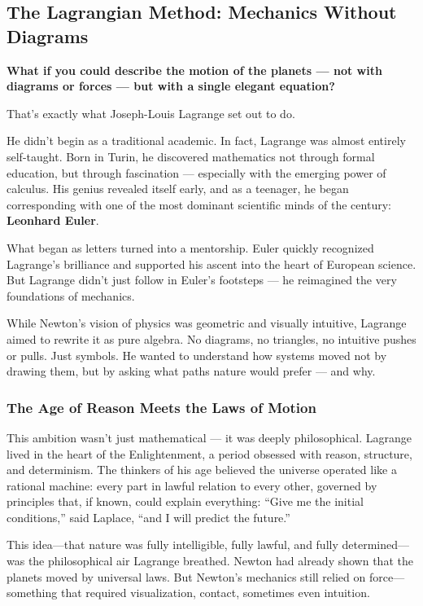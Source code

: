 \subsection{The Lagrangian Method: Mechanics Without Diagrams}

\textbf{What if you could describe the motion of the planets — not with diagrams or forces — but with a single elegant equation?}

That’s exactly what Joseph-Louis Lagrange set out to do.

He didn’t begin as a traditional academic. In fact, Lagrange was almost entirely self-taught. Born in Turin, he discovered mathematics not through formal education, but through fascination — especially with the emerging power of calculus. His genius revealed itself early, and as a teenager, he began corresponding with one of the most dominant scientific minds of the century: \textbf{Leonhard Euler}.

What began as letters turned into a mentorship. Euler quickly recognized Lagrange’s brilliance and supported his ascent into the heart of European science. But Lagrange didn’t just follow in Euler’s footsteps — he reimagined the very foundations of mechanics.

While Newton's vision of physics was geometric and visually intuitive, Lagrange aimed to rewrite it as pure algebra. No diagrams, no triangles, no intuitive pushes or pulls. Just symbols. He wanted to understand how systems moved not by drawing them, but by asking what paths nature would prefer — and why.


\subsubsection{The Age of Reason Meets the Laws of Motion}

This ambition wasn’t just mathematical — it was deeply philosophical. Lagrange lived in the heart of the Enlightenment, a period obsessed with reason, structure, and determinism. The thinkers of his age believed the universe operated like a rational machine: every part in lawful relation to every other, governed by principles that, if known, could explain everything:  ``Give me the initial conditions,'' said Laplace, ``and I will predict the future.''


This idea—that nature was fully intelligible, fully lawful, and fully determined—was the philosophical air Lagrange breathed. Newton had already shown that the planets moved by universal laws. But Newton’s mechanics still relied on force—something that required visualization, contact, sometimes even intuition.

